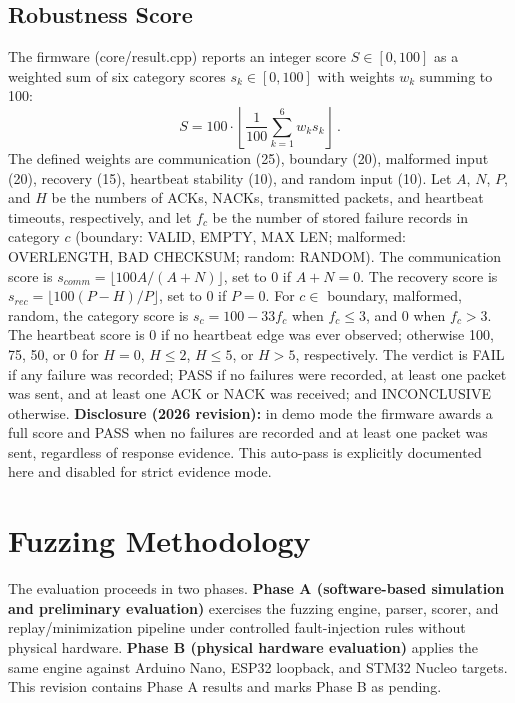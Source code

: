 \documentclass[10pt,letterpaper]{article}
\begin{document}
\subsection{Robustness Score}
The firmware (core/result.cpp) reports an integer score $S \in [0, 100]$ as a weighted sum of six category scores $s_k \in [0, 100]$ with weights $w_k$ summing to 100:
\begin{equation}
S = 100 \cdot \left\lfloor \frac{1}{100} \sum_{k=1}^{6} w_k s_k \right\rfloor~.
\label{eq:score}
\end{equation}
The defined weights are communication (25), boundary (20), malformed input (20), recovery (15), heartbeat stability (10), and random input (10). Let $A$, $N$, $P$, and $H$ be the numbers of ACKs, NACKs, transmitted packets, and heartbeat timeouts, respectively, and let $f_c$ be the number of stored failure records in category $c$ (boundary: VALID, EMPTY, MAX LEN; malformed: OVERLENGTH, BAD CHECKSUM; random: RANDOM). The communication score is $s_{comm} = \lfloor 100A/(A+N) \rfloor$, set to 0 if $A+N=0$. The recovery score is $s_{rec} = \lfloor 100(P-H)/P \rfloor$, set to 0 if $P=0$. For $c \in$ {boundary, malformed, random}, the category score is $s_c = 100 - 33f_c$ when $f_c \le 3$, and 0 when $f_c > 3$. The heartbeat score is 0 if no heartbeat edge was ever observed; otherwise 100, 75, 50, or 0 for $H=0$, $H \le 2$, $H \le 5$, or $H > 5$, respectively. The verdict is FAIL if any failure was recorded; PASS if no failures were recorded, at least one packet was sent, and at least one ACK or NACK was received; and INCONCLUSIVE otherwise. \textbf{Disclosure (2026 revision):} in demo mode the firmware awards a full score and PASS when no failures are recorded and at least one packet was sent, regardless of response evidence. This auto-pass is explicitly documented here and disabled for strict evidence mode.

\section{Fuzzing Methodology}
The evaluation proceeds in two phases. \textbf{Phase A (software-based simulation and preliminary evaluation)} exercises the fuzzing engine, parser, scorer, and replay/minimization pipeline under controlled fault-injection rules without physical hardware. \textbf{Phase B (physical hardware evaluation)} applies the same engine against Arduino Nano, ESP32 loopback, and STM32 Nucleo targets. This revision contains Phase A results and marks Phase B as pending.
\end{document}
